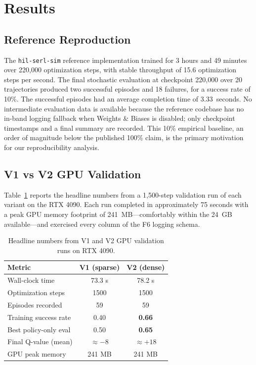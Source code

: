 \documentclass[12pt,a4paper]{article}
\begin{document}
\section{Results} \label{sec:results}

\subsection{Reference Reproduction}

The \texttt{hil-serl-sim} reference implementation trained for 3 hours and 49 minutes over 220{,}000 optimization steps, with stable throughput of 15.6 optimization steps per second. The final stochastic evaluation at checkpoint 220{,}000 over 20 trajectories produced two successful episodes and 18 failures, for a success rate of 10\%. The successful episodes had an average completion time of 3.33~seconds. No intermediate evaluation data is available because the reference codebase has no in-band logging fallback when Weights \& Biases is disabled; only checkpoint timestamps and a final summary are recorded. This 10\% empirical baseline, an order of magnitude below the published 100\% claim, is the primary motivation for our reproducibility analysis.

\subsection{V1 vs V2 GPU Validation}

Table~\ref{tab:smoke_results} reports the headline numbers from a 1{,}500-step validation run of each variant on the RTX 4090. Each run completed in approximately 75 seconds with a peak GPU memory footprint of 241~MB---comfortably within the 24~GB available---and exercised every column of the F6 logging schema.

\begin{table}[t]
\centering
\caption{Headline numbers from V1 and V2 GPU validation runs on RTX 4090.}
\label{tab:smoke_results}
\small
\begin{tabular}{lcc}
\toprule
\textbf{Metric} & \textbf{V1 (sparse)} & \textbf{V2 (dense)} \\
\midrule
Wall-clock time                  & 73.3 s    & 78.2 s \\
Optimization steps               & 1500      & 1500 \\
Episodes recorded                & 59        & 59 \\
Training success rate            & 0.40      & \textbf{0.66} \\
Best policy-only eval            & 0.50      & \textbf{0.65} \\
Final Q-value (mean)             & $\approx -8$ & $\approx +18$ \\
GPU peak memory                  & 241 MB    & 241 MB \\
\bottomrule
\end{tabular}
\end{table}
\end{document}
